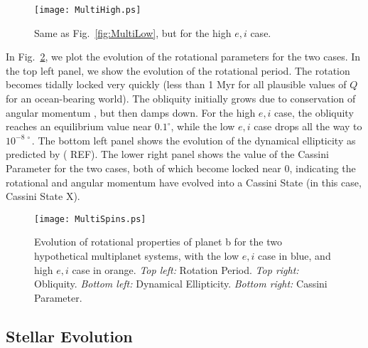 \documentclass[preprint,12pt]{aastex}
\newcommand{\xxx}[1]{{\color{red} #1}} %
\begin{document}
\begin{figure} 
\begin{center}
\texttt{[image: MultiHigh.ps]}
\end{center}
\caption{Same as Fig.~\ref{fig:MultiLow}, but for the high $e,i$ case.}
\label{fig:MultiHigh}
\end{figure}

In Fig.~\ref{fig:MultiSpins}, we plot the evolution of the rotational
parameters for the two cases. In the top left panel, we show the
evolution of the rotational period. The rotation becomes tidally
locked very quickly (less than 1 Myr for all plausible values of $Q$
for an ocean-bearing world). The obliquity initially grows due to
conservation of angular momentum \citep{Correia08}, but then damps
down. For the high $e,i$ case, the obliquity reaches an equilibrium
value near $0.1^\circ$, while the low $e,i$ case drops all the way to
$10^{-8~\circ}$. The bottom left panel shows the evolution of the
dynamical ellipticity as predicted by (\xxx{REF}). The lower right panel
shows the value of the Cassini Parameter for the two cases, both of
which become locked near 0, indicating the rotational and angular
momentum have evolved into a Cassini State (in this case, Cassini
State X).

\begin{figure} 
\begin{center}
\texttt{[image: MultiSpins.ps]}
\end{center}
\caption{Evolution of rotational properties of planet b for the two hypothetical multiplanet systems, with the low $e,i$ case in blue, and high $e,i$ case in orange. {\it Top left:} Rotation Period. {\it Top right:} Obliquity. {\it Bottom left:} Dynamical Ellipticity. {\it Bottom right:} Cassini Parameter.}
\label{fig:MultiSpins}
\end{figure}




\subsection{Stellar Evolution}
\label{sec:results:stellar}

\end{document}

